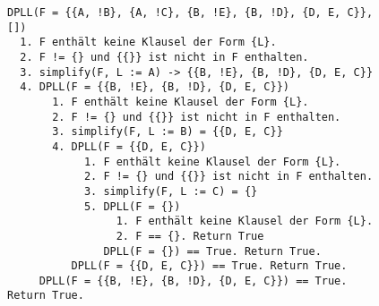\documentclass[10pt, oneside]{article}
\begin{document}
\begin{figure}[p]
    \caption{}
    \label{fig:1.b}
\begin{verbatim}
DPLL(F = {{A, !B}, {A, !C}, {B, !E}, {B, !D}, {D, E, C}}, [])
  1. F enthält keine Klausel der Form {L}.
  2. F != {} und {{}} ist nicht in F enthalten.
  3. simplify(F, L := A) -> {{B, !E}, {B, !D}, {D, E, C}}
  4. DPLL(F = {{B, !E}, {B, !D}, {D, E, C}})
       1. F enthält keine Klausel der Form {L}.
       2. F != {} und {{}} ist nicht in F enthalten.
       3. simplify(F, L := B) = {{D, E, C}}
       4. DPLL(F = {{D, E, C}})
            1. F enthält keine Klausel der Form {L}.
            2. F != {} und {{}} ist nicht in F enthalten.
            3. simplify(F, L := C) = {}
            5. DPLL(F = {})
                 1. F enthält keine Klausel der Form {L}.
                 2. F == {}. Return True
               DPLL(F = {}) == True. Return True.
          DPLL(F = {{D, E, C}}) == True. Return True.
     DPLL(F = {{B, !E}, {B, !D}, {D, E, C}}) == True. Return True.
\end{verbatim}
\end{figure}

\FloatBarrier
\end{document}
